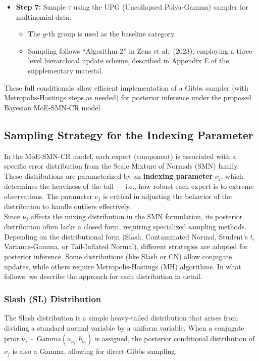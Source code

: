 \documentclass[10.5pt]{article} %
\begin{document}
\begin{itemize}
    \item \textbf{Step 7:} Sample $\tau$ using the UPG (Uncollapsed Polya-Gamma) sampler for multinomial data.
    \begin{itemize}
        \item The $g$-th group is used as the baseline category.
        \item Sampling follows ``Algorithm 2'' in Zens et al.\ (2023), employing a three-level hierarchical update scheme, described in Appendix E of the supplementary material.
    \end{itemize}

\end{itemize}
These full conditionals allow efficient implementation of a Gibbs sampler (with Metropolis-Hastings steps as needed) for posterior inference under the proposed Bayesian MoE-SMN-CR model.

\subsection{Sampling Strategy for the Indexing Parameter}

In the MoE-SMN-CR model, each expert (component) is associated with a specific error distribution from the Scale Mixture of Normals (SMN) family. These distributions are parameterized by an \textbf{indexing parameter} $\nu_j$, which determines the heaviness of the tail — i.e., how robust each expert is to extreme observations. The parameter $\nu_j$ is critical in adjusting the behavior of the distribution to handle outliers effectively.\\

\noindent
Since $\nu_j$ affects the mixing distribution in the SMN formulation, its posterior distribution often lacks a closed form, requiring specialized sampling methods. Depending on the distributional form (Slash, Contaminated Normal, Student's $t$, Variance-Gamma, or Tail-Inflated Normal), different strategies are adopted for posterior inference. Some distributions (like Slash or CN) allow conjugate updates, while others require Metropolis-Hastings (MH) algorithms. In what follows, we describe the approach for each distribution in detail.

\subsubsection{Slash (SL) Distribution}
The Slash distribution is a simple heavy-tailed distribution that arises from dividing a standard normal variable by a uniform variable. When a conjugate prior $\nu_j \sim \text{Gamma}(a_{\nu_j}, b_{\nu_j})$ is assigned, the posterior conditional distribution of $\nu_j$ is also a Gamma, allowing for direct Gibbs sampling.
\end{document}

